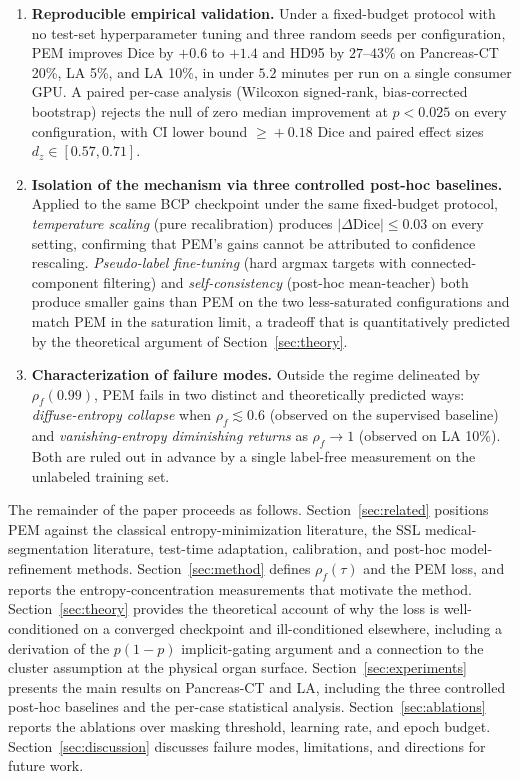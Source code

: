 \begin{enumerate}
    \item \textbf{Reproducible empirical validation.} Under a fixed-budget protocol with no test-set hyperparameter tuning and three random seeds per configuration, PEM improves Dice by $+0.6$ to $+1.4$ and HD95 by $27$--$43\%$ on Pancreas-CT 20\%, LA 5\%, and LA 10\%, in under $5.2$ minutes per run on a single consumer GPU. A paired per-case analysis (Wilcoxon signed-rank, bias-corrected bootstrap) rejects the null of zero median improvement at $p\!<\!0.025$ on every configuration, with CI lower bound $\geq\!+0.18$ Dice and paired effect sizes $d_z\!\in\![0.57, 0.71]$.
    \item \textbf{Isolation of the mechanism via three controlled post-hoc baselines.} Applied to the same BCP checkpoint under the same fixed-budget protocol, \emph{temperature scaling} (pure recalibration) produces $|\Delta\mathrm{Dice}|\!\le\!0.03$ on every setting, confirming that PEM's gains cannot be attributed to confidence rescaling. \emph{Pseudo-label fine-tuning} (hard argmax targets with connected-component filtering) and \emph{self-consistency} (post-hoc mean-teacher) both produce smaller gains than PEM on the two less-saturated configurations and match PEM in the saturation limit, a tradeoff that is quantitatively predicted by the theoretical argument of Section~\ref{sec:theory}.
    \item \textbf{Characterization of failure modes.} Outside the regime delineated by $\rho_f(0.99)$, PEM fails in two distinct and theoretically predicted ways: \emph{diffuse-entropy collapse} when $\rho_f\!\lesssim\!0.6$ (observed on the supervised baseline) and \emph{vanishing-entropy diminishing returns} as $\rho_f\!\to\!1$ (observed on LA 10\%). Both are ruled out in advance by a single label-free measurement on the unlabeled training set.
\end{enumerate}

The remainder of the paper proceeds as follows. Section~\ref{sec:related} positions PEM against the classical entropy-minimization literature, the SSL medical-segmentation literature, test-time adaptation, calibration, and post-hoc model-refinement methods. Section~\ref{sec:method} defines $\rho_f(\tau)$ and the PEM loss, and reports the entropy-concentration measurements that motivate the method. Section~\ref{sec:theory} provides the theoretical account of why the loss is well-conditioned on a converged checkpoint and ill-conditioned elsewhere, including a derivation of the $p(1{-}p)$ implicit-gating argument and a connection to the cluster assumption at the physical organ surface. Section~\ref{sec:experiments} presents the main results on Pancreas-CT and LA, including the three controlled post-hoc baselines and the per-case statistical analysis. Section~\ref{sec:ablations} reports the ablations over masking threshold, learning rate, and epoch budget. Section~\ref{sec:discussion} discusses failure modes, limitations, and directions for future work.
